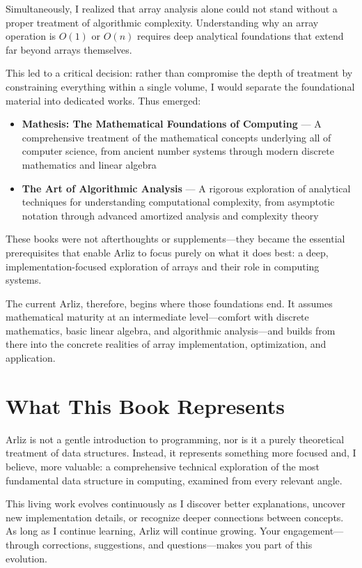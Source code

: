 Simultaneously, I realized that array analysis alone could not stand without a proper treatment of algorithmic complexity. Understanding why an array operation is $O(1)$ or $O(n)$ requires deep analytical foundations that extend far beyond arrays themselves.

This led to a critical decision: rather than compromise the depth of treatment by constraining everything within a single volume, I would separate the foundational material into dedicated works. Thus emerged:

\begin{itemize}
	\item \textbf{Mathesis: The Mathematical Foundations of Computing} — A comprehensive treatment of the mathematical concepts underlying all of computer science, from ancient number systems through modern discrete mathematics and linear algebra
	
	\item \textbf{The Art of Algorithmic Analysis} — A rigorous exploration of analytical techniques for understanding computational complexity, from asymptotic notation through advanced amortized analysis and complexity theory
\end{itemize}

These books were not afterthoughts or supplements—they became the essential prerequisites that enable Arliz to focus purely on what it does best: a deep, implementation-focused exploration of arrays and their role in computing systems.

The current Arliz, therefore, begins where those foundations end. It assumes mathematical maturity at an intermediate level—comfort with discrete mathematics, basic linear algebra, and algorithmic analysis—and builds from there into the concrete realities of array implementation, optimization, and application.

\section*{What This Book Represents}

Arliz is not a gentle introduction to programming, nor is it a purely theoretical treatment of data structures. Instead, it represents something more focused and, I believe, more valuable: a comprehensive technical exploration of the most fundamental data structure in computing, examined from every relevant angle.

This living work evolves continuously as I discover better explanations, uncover new implementation details, or recognize deeper connections between concepts. As long as I continue learning, Arliz will continue growing. Your engagement—through corrections, suggestions, and questions—makes you part of this evolution.

